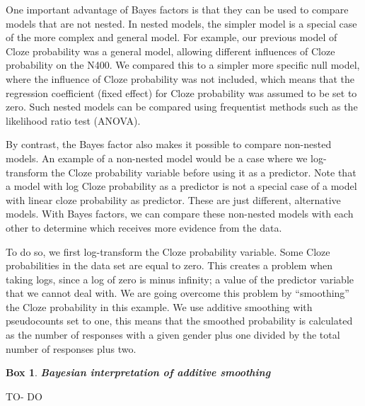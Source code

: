 \documentclass[12pt,]{krantz}
\newenvironment{Shaded}{\begin{snugshade}}{\end{snugshade}}
\newcommand{\DataTypeTok}[1]{\textcolor[rgb]{0.13,0.29,0.53}{#1}}
\newcommand{\DecValTok}[1]{\textcolor[rgb]{0.00,0.00,0.81}{#1}}
\newcommand{\KeywordTok}[1]{\textcolor[rgb]{0.13,0.29,0.53}{\textbf{#1}}}
\newcommand{\NormalTok}[1]{#1}
\newcommand{\OperatorTok}[1]{\textcolor[rgb]{0.81,0.36,0.00}{\textbf{#1}}}
\newcommand{\StringTok}[1]{\textcolor[rgb]{0.31,0.60,0.02}{#1}}
\let\Begin\begin
\let\End\end
\newtheorem{theorem}{Box}[chapter]
\theoremstyle{definition}
\theoremstyle{definition}
\theoremstyle{definition}
\theoremstyle{remark}
\begin{document}
One important advantage of Bayes factors is that they can be used to compare models that are not nested. In nested models, the simpler model is a special case of the more complex and general model. For example, our previous model of Cloze probability was a general model, allowing different influences of Cloze probability on the N400. We compared this to a simpler more specific null model, where the influence of Cloze probability was not included, which means that the regression coefficient (fixed effect) for Cloze probability was assumed to be set to zero. Such nested models can be compared using frequentist methods such as the likelihood ratio test (ANOVA).

By contrast, the Bayes factor also makes it possible to compare non-nested models. An example of a non-nested model would be a case where we log-transform the Cloze probability variable before using it as a predictor. Note that a model with log Cloze probability as a predictor is not a special case of a model with linear cloze probability as predictor. These are just different, alternative models. With Bayes factors, we can compare these non-nested models with each other to determine which receives more evidence from the data.

To do so, we first log-transform the Cloze probability variable. Some Cloze probabilities in the data set are equal to zero. This creates a problem when taking logs, since a log of zero is minus infinity; a value of the predictor variable that we cannot deal with. We are going overcome this problem by ``smoothing'' the Cloze probability in this example. We use additive smoothing \citep[also called Laplace or Lidstone smoothing;][]{Lidstone1920, ChenGoodman1999} with pseudocounts set to one, this means that the smoothed probability is calculated as the number of responses with a given gender plus one divided by the total number of responses plus two.

\Begin{extra}

\begin{theorem}
\protect\hypertarget{thm:smoothing}{}{\label{thm:smoothing} }\textbf{Bayesian interpretation of additive smoothing}
\end{theorem}

TO- DO

\End{extra}

\begin{Shaded}
\end{Shaded}
\end{document}
